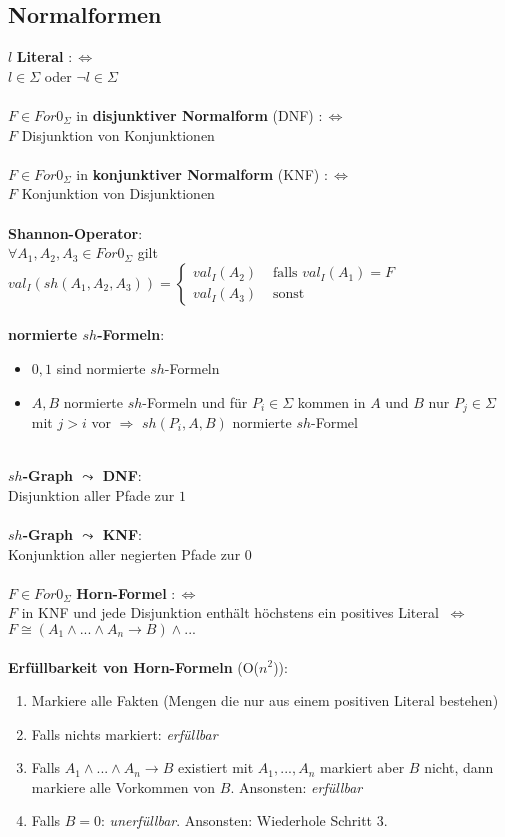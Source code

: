 \documentclass[a4paper,11pt]{scrartcl}
\newcommand{\tbf}{\textbf}
\newcommand{\Lra}{\Leftrightarrow}
\newcommand{\Forn}{For0_\Sigma}
\theoremstyle{default}
\begin{document}
\subsection{Normalformen}
$l$ \tbf{Literal} $:\Lra$ \\
$l \in \Sigma$ oder $\neg l \in \Sigma$ \\
\ \\ $F \in \Forn$ in \tbf{disjunktiver Normalform} (DNF) $:\Lra$ \\
$F$ Disjunktion von Konjunktionen \\
\ \\ $F \in \Forn$ in \tbf{konjunktiver Normalform} (KNF) $:\Lra$ \\
$F$ Konjunktion von Disjunktionen \\
\ \\ \tbf{Shannon-Operator}: \\
$\forall A_1, A_2, A_3 \in \Forn$ gilt $val_I(sh(A_1,A_2,A_3)) = 
\begin{cases} val_I(A_2) & \text{ falls } val_I(A_1)=F \\ 
val_I(A_3) & \text { sonst} \end{cases}$ \\
\ \\ \tbf{normierte $sh$-Formeln}:
\begin{itemize}
 \item $0, 1$ sind normierte $sh$-Formeln
 \item $A, B$ normierte $sh$-Formeln und für $P_i \in \Sigma$ kommen in $A$ und $B$ nur $P_j \in \Sigma$ mit $j > i$  vor $\Rightarrow$ $sh(P_i,A,B)$ normierte $sh$-Formel
\end{itemize}
\ \\ \tbf{$sh$-Graph $\leadsto$ DNF}: \\
Disjunktion aller Pfade zur $1$ \\
\ \\ \tbf{$sh$-Graph $\leadsto$ KNF}: \\
Konjunktion aller negierten Pfade zur $0$ \\
\ \\ $F \in \Forn$ \tbf{Horn-Formel} $:\Lra$ \\
$F$ in KNF und jede Disjunktion enthält höchstens ein positives Literal $\ \Leftrightarrow \ $ $F \cong (A_1 \land ... \land A_n \rightarrow B) \land ...$ \\
\ \\ \tbf{Erfüllbarkeit von Horn-Formeln} (O($n^2$)):
\begin{enumerate}
 \item Markiere alle Fakten (Mengen die nur aus einem positiven Literal bestehen)
 \item Falls nichts markiert: \textit{erfüllbar}
 \item Falls $A_1 \land ... \land A_n \rightarrow B$ existiert mit $A_1, ..., A_n$ markiert aber $B$ nicht, dann markiere alle Vorkommen von $B$. Ansonsten: \textit{erfüllbar}
 \item Falls $B = 0$: \textit{unerfüllbar}. Ansonsten: Wiederhole Schritt 3.
\end{enumerate}
\end{document}
